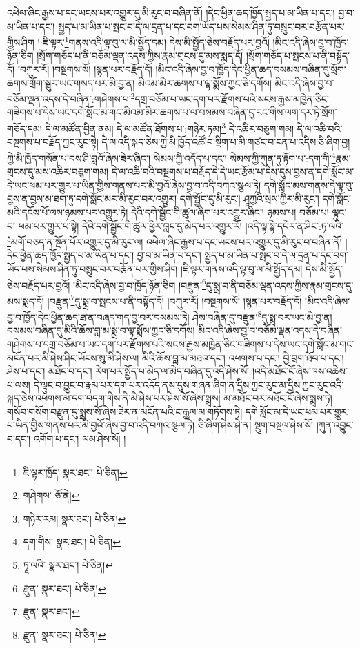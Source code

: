 འཕེལ་ཞིང་རྒྱས་པ་དང་ཡངས་པར་འགྱུར་དུ་མི་རུང་བ་བཞིན་ནོ། །དེང་ཕྱིན་ཆད་ཁྱོད་སྤྱད་པ་མ་ཡིན་པ་དང་། བྱ་བ་མ་ཡིན་པ་དང་། སྤྱད་པ་མ་ཡིན་པ་སྤང་བ་དེ་ལ་དྲན་པ་དང་བག་ཡོད་པས་སེམས་ཤིན་ཏུ་བསྲུང་བར་བརྩོན་པར་གྱིས་ཤིག །:ཇི་ལྟར་\footnote{ཇི་ལྟར་ཁྱོད་  སྣར་ཐང་།  པེ་ཅིན། }གནས་འདི་ལྟ་བུ་ལ་མི་སྤྱོད་དམ། དེས་མི་སྤྱོད་ཅེས་བརྗོད་པར་བྱའོ། །མིང་འདི་ཞེས་བྱ་བ་ཁྱོད་ཉོན་ཅིག །སྲོག་གཅོད་པ་ནི་བཅོམ་ལྡན་འདས་ཀྱིས་རྣམ་གྲངས་དུ་མས་སྨད་དོ། །སྲོག་གཅོད་པ་སྤངས་པ་ནི་བསྟོད་དོ། །བཀུར་རོ། །བསྔགས་སོ། །སྙན་པར་བརྗོད་དོ། །མིང་འདི་ཞེས་བྱ་བ་ཁྱོད་དེང་ཕྱིན་ཆད་བསམས་བཞིན་དུ་སྲོག་ཆགས་གྲོག་སྦུར་ཡང་གསད་པར་མི་བྱ་ན། མིའམ་མིར་ཆགས་པ་ལྟ་སྨོས་ཀྱང་ཅི་དགོས། མིང་འདི་ཞེས་བྱ་བ་བཅོམ་ལྡན་འདས་དེ་བཞིན་:གཤེགས་པ་\footnote{གཤེགས་  ཅོ་ནེ། }དགྲ་བཅོམ་པ་ཡང་དག་པར་རྫོགས་པའི་སངས་རྒྱས་མཁྱེན་ཅིང་གཟིགས་པ་དེས་ཡང་དགེ་སློང་མ་གང་མིའམ་མིར་ཆགས་པ་ལ་བསམས་བཞིན་དུ་རང་གིས་ལག་དར་ཏེ་སྲོག་གཅོད་དམ། དེ་ལ་མཚོན་བྱིན་ནམ། དེ་ལ་མཚོན་ཐོགས་པ་:གཉེར་ཏམ།\footnote{གཉེར་རམ།  སྣར་ཐང་།  པེ་ཅིན། } དེ་འཆིར་བཅུག་གམ། དེ་ལ་འཆི་བའི་བསྔགས་པ་བརྗོད་ཀྱང་རུང་སྟེ། དེ་ལ་འདི་སྐད་ཅེས་ཀྱེ་མི་ཁྱོད་འཚོ་བ་སྡིག་པ་མི་གཙང་བ་ངན་པ་འདིས་ཅི་ཞིག་བྱ། ཀྱེ་མི་ཁྱོད་གསོན་པ་བས་ཤི་བླའོ་ཞེས་ཟེར་ཞིང་། སེམས་ཀྱི་འདོད་པ་དང་། སེམས་ཀྱི་ཀུན་ཏུ་རྟོག་པ་:དག་གི་\footnote{དག་གིས་  སྣར་ཐང་།  པེ་ཅིན། }རྣམ་གྲངས་དུ་མས་འཆིར་བཅུག་གམ། དེ་ལ་འཆི་བའི་བསྔགས་པ་བརྗོད་དེ་དེ་ཡང་རྩོམ་པ་དེས་དུས་བྱས་ན་དགེ་སློང་མ་དེ་ཡང་ཕམ་པར་གྱུར་པ་ཡིན་གྱིས་གནས་པར་མི་བྱའོ་ཞེས་བྱ་བ་འདི་བཀའ་སྩལ་ཏེ། དགེ་སློང་མས་གནས་དེ་ལྟ་བུ་བྱས་ན་བྱས་མ་ཐག་ཏུ་དགེ་སློང་མར་མི་རུང་བར་འགྱུར། དགེ་སྦྱོང་དུ་མི་རུང་། ཤཱཀྱའི་སྲས་ཀྱིར་མི་རུང་། དགེ་སློང་མའི་དངོས་པོ་ལས་ཉམས་པར་འགྱུར་ཏེ། དེའི་དགེ་སྦྱོང་གི་ཚུལ་ཞིག་པར་འགྱུར་ཞིང་། ཉམས་པ། བཅོམ་པ། ལྟུང་བ། ཕམ་པར་གྱུར་པ་སྟེ། དེའི་དགེ་སྦྱོང་གི་ཚུལ་ཕྱིར་བླང་དུ་མེད་པར་འགྱུར་རོ། །འདི་ལྟ་སྟེ་དཔེར་ན་ཤིང་:ཏ་ལའི་\footnote{ཏཱ་ལའི་  སྣར་ཐང་།  པེ་ཅིན། }མགོ་བཅད་ན་སྔོན་པོར་འགྱུར་དུ་མི་རུང་ལ། འཕེལ་ཞིང་རྒྱས་པ་དང་ཡངས་པར་འགྱུར་དུ་མི་རུང་བ་བཞིན་ནོ། །དེང་ཕྱིན་ཆད་ཁྱོད་སྤྱད་པ་མ་ཡིན་པ་དང་། བྱ་བ་མ་ཡིན་པ་དང་། སྤྱད་པ་མ་ཡིན་པ་སྤང་བ་དེ་ལ་དྲན་པ་དང་བག་ཡོད་པས་སེམས་ཤིན་ཏུ་བསྲུང་བར་བརྩོན་པར་གྱིས་ཤིག །ཇི་ལྟར་གནས་འདི་ལྟ་བུ་ལ་མི་སྤྱོད་དམ། དེས་མི་སྤྱོད་ཅེས་བརྗོད་པར་བྱའོ། །མིང་འདི་ཞེས་བྱ་བ་ཁྱོད་ཉོན་ཅིག །བརྫུན་\footnote{རྫུན་  སྣར་ཐང་།  པེ་ཅིན། }དུ་སྨྲ་བ་ནི་བཅོམ་ལྡན་འདས་ཀྱིས་རྣམ་གྲངས་དུ་མས་སྨད་དོ། །བརྫུན་\footnote{རྫུན་  སྣར་ཐང་། }དུ་སྨྲ་བ་སྤངས་པ་ནི་བསྟོད་དོ། །བཀུར་རོ། །བསྔགས་སོ། །སྙན་པར་བརྗོད་དོ། །མིང་འདི་ཞེས་བྱ་བ་ཁྱོད་དེང་ཕྱིན་ཆད་ཐ་ན་བཞད་གད་བྱ་བར་བསམས་ཏེ། ཤེས་བཞིན་དུ་བརྫུན་\footnote{རྫུན་  སྣར་ཐང་།  པེ་ཅིན། }དུ་སྨྲ་བར་ཡང་མི་བྱ་ན། བསམས་བཞིན་དུ་མིའི་ཆོས་བླ་མ་སྨྲ་བ་ལྟ་སྨོས་ཀྱང་ཅི་དགོས། མིང་འདི་ཞེས་བྱ་བ་བཅོམ་ལྡན་འདས་དེ་བཞིན་གཤེགས་པ་དགྲ་བཅོམ་པ་ཡང་དག་པར་རྫོགས་པའི་སངས་རྒྱས་མཁྱེན་ཅིང་གཟིགས་པ་དེས་ཡང་དགེ་སློང་མ་གང་མངོན་པར་མི་ཤེས་ཤིང་ཡོངས་སུ་མི་ཤེས་ལ། མིའི་ཆོས་བླ་མ་མཐའ་དང་། འཕགས་པ་དང་། བྱེ་བྲག་ཐོབ་པ་དང་། ཤེས་པ་དང་། མཐོང་བ་དང་། རེག་པར་སྤྱོད་པ་མེད་ལ་མེད་བཞིན་དུ་འདི་ཤེས་སོ། །འདི་མཐོང་ངོ་ཞེས་ཁས་འཆེས་པ་ལས། དེ་ལྟུང་བ་བྱུང་བ་རྣམ་པར་དག་པར་འདོད་ནས་དུས་གཞན་ཞིག་ན་དྲིས་ཀྱང་རུང་མ་དྲིས་ཀྱང་རུང་འདི་སྐད་ཅེས་འཕགས་མ་དག་བདག་གིས་ནི་མི་ཤེས་པར་ཤེས་སོ་ཞེས་སྨྲས། མ་མཐོང་བར་མཐོང་ངོ་ཞེས་སྨྲས་ཏེ། གསོབ་གསོག་བརྫུན་དུ་སྨྲས་སོ་ཞེས་ཟེར་ན་མངོན་པའི་ང་རྒྱལ་མ་གཏོགས་ཏེ། དགེ་སློང་མ་དེ་ཡང་ཕམ་པར་གྱུར་པ་ཡིན་གྱིས་གནས་པར་མི་བྱའོ་ཞེས་བྱ་བ་འདི་བཀའ་སྩལ་ཏེ། ཅི་ཞིག་ཤེས་ཤེ་ན། སྡུག་བསྔལ་ཤེས་སོ། །ཀུན་འབྱུང་བ་དང་། འགོག་པ་དང་། ལམ་ཤེས་སོ། །
